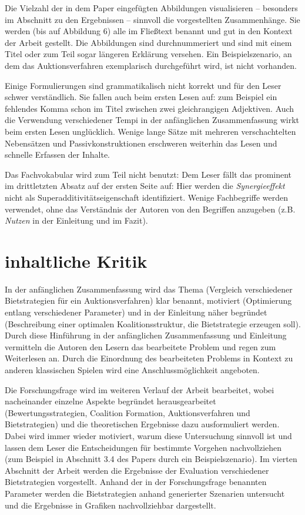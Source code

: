 \documentclass[sigconf]{acmart}
\begin{document}
Die Vielzahl der in dem Paper eingefügten Abbildungen visualisieren -- besonders im Abschnitt zu den Ergebnissen -- sinnvoll die vorgestellten Zusammenhänge. Sie werden (bis auf Abbildung 6) alle im Fließtext benannt und gut in den Kontext der Arbeit gestellt. Die Abbildungen sind durchnummeriert und sind mit einem Titel oder zum Teil sogar längeren Erklärung versehen. Ein Beispielszenario, an dem das Auktionsverfahren exemplarisch durchgeführt wird, ist nicht vorhanden.

Einige Formulierungen sind grammatikalisch nicht korrekt und für den Leser schwer verständlich. Sie fallen auch beim ersten Lesen auf: zum Beispiel ein fehlendes Komma schon im Titel zwischen zwei gleichrangigen Adjektiven. Auch die Verwendung verschiedener Tempi in der anfänglichen Zusammenfassung wirkt beim ersten Lesen unglücklich. Wenige lange Sätze mit mehreren verschachtelten Nebensätzen und Passivkonstruktionen erschweren weiterhin das Lesen und schnelle Erfassen der Inhalte.

Das Fachvokabular wird zum Teil nicht benutzt: Dem Leser fällt das prominent im drittletzten Absatz auf der ersten Seite auf: Hier werden die \textit{Synergieeffekt} nicht als Superadditivitätseigenschaft identifiziert. Wenige Fachbegriffe werden verwendet, ohne das Verständnis der Autoren von den Begriffen anzugeben (z.B. \textit{Nutzen} in der Einleitung und im Fazit).


\section{inhaltliche Kritik}
\label{inhalt}
In der anfänglichen Zusammenfassung wird das Thema (Vergleich verschiedener Bietstrategien für ein Auktionsverfahren) klar benannt, motiviert (Optimierung entlang verschiedener Parameter) und in der Einleitung näher begründet (Beschreibung einer optimalen Koalitionsstruktur, die Bietstrategie erzeugen soll). Durch diese Hinführung in der anfänglichen Zusammenfassung und Einleitung vermitteln die Autoren den Lesern das bearbeitete Problem und regen zum Weiterlesen an. Durch die Einordnung des bearbeiteten Problems in Kontext zu anderen klassischen Spielen wird eine Anschlussmöglichkeit angeboten.

Die Forschungsfrage wird im weiteren Verlauf der Arbeit bearbeitet, wobei nacheinander einzelne Aspekte begründet herausgearbeitet (Bewertungsstrategien, Coalition Formation, Auktionsverfahren und Bietstrategien) und die theoretischen Ergebnisse dazu ausformuliert werden. Dabei wird immer wieder motiviert, warum diese Untersuchung sinnvoll ist und lassen dem Leser die Entscheidungen für bestimmte Vorgehen nachvollziehen (zum Beispiel in Abschnitt 3.4 des Papers durch ein Beispielszenario). Im vierten Abschnitt der Arbeit werden die Ergebnisse der Evaluation verschiedener Bietstrategien vorgestellt. Anhand der in der Forschungsfrage benannten Parameter werden die Bietstrategien anhand generierter Szenarien untersucht und die Ergebnisse in Grafiken nachvollziehbar dargestellt.
\end{document}
